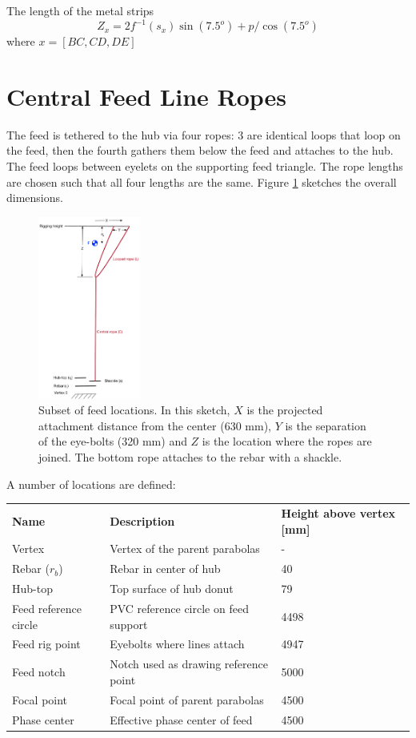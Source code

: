 \documentclass{article}
\begin{document}
The length of the metal strips
\begin{equation}
Z_{x} = 2f^{-1}(s_{x})\sin(7.5^o) + p/\cos(7.5^o)
\end{equation}
where $x = [BC,CD,DE]$

\newpage
\section{Central Feed Line Ropes}
The feed is tethered to the hub via four ropes:  3 are identical loops that loop on the feed, then the fourth gathers them below the feed and attaches to the hub.  
The feed loops between eyelets on the supporting feed triangle.  The rope lengths are chosen such that all four lengths are the same.  Figure \ref{fig:feedlinelen} sketches the overall dimensions.

\begin{figure}[H]
\includegraphics[width=0.3\textwidth]{feed_dims.pdf}
\centering
\vspace{-.15in}
\caption{Subset of feed locations.  In this sketch, $X$ is the projected attachment distance from the center (630 mm), $Y$ is the separation of the eye-bolts (320 mm) and $Z$ is the location where the ropes are joined.  The bottom rope attaches to the rebar with a shackle.}
\label{fig:feedlinelen}
\end{figure}

\vspace{-0.1in}
\noindent
A number of locations are defined:
\vspace{0.1in}

\begin{tabular}{l l l}
\bf{Name} & \bf{Description} & \bf{Height above vertex [mm]} \\
Vertex & Vertex of the parent parabolas & - \\
Rebar ($r_b$)  & Rebar in center of hub & 40 \\
Hub-top & Top surface of hub donut & 79 \\
Feed reference circle & PVC reference circle on feed support & 4498\\
Feed rig point & Eyebolts where lines attach & 4947\\
Feed notch & Notch used as drawing reference point & 5000 \\
Focal point & Focal point of parent parabolas & 4500 \\
Phase center & Effective phase center of feed & 4500 \\
\end{tabular}
\vspace{.2in}
\end{document}

